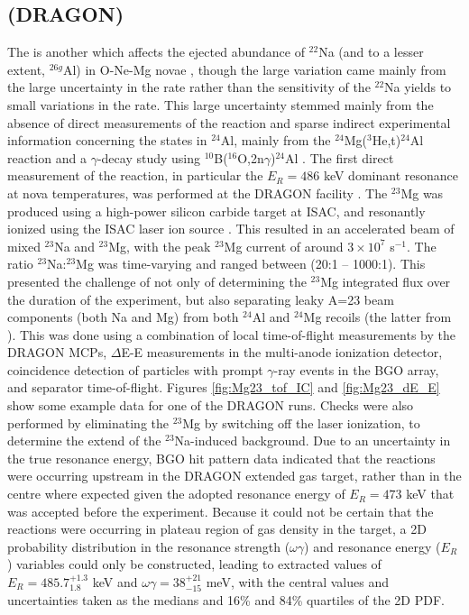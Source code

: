 \subsection{ (DRAGON)}
The  is another which affects the ejected abundance of $^{22}$Na (and to a lesser extent, $^{26g}$Al) in O-Ne-Mg novae \cite{ilia02}, though the large variation came mainly from the large uncertainty in the rate rather than the sensitivity of the $^{22}$Na yields to small variations in the rate. This large uncertainty stemmed mainly from the absence of direct measurements of the reaction and sparse indirect experimental information concerning the states in $^{24}$Al, mainly from the $^{24}$Mg($^{3}$He,t)$^{24}$Al reaction \cite{gre91,kub95,vis07,zeg08} and a $\gamma$-decay study using $^{10}$B($^{16}$O,2n$\gamma$)$^{24}$Al \cite{lot08}. 
The first direct measurement of the  reaction, in particular the $E_{R}=486$ keV dominant resonance at nova temperatures, was performed at the DRAGON facility \cite{eri10}. The $^{23}$Mg was produced using a high-power silicon carbide target at ISAC, and resonantly ionized using the ISAC laser ion source \cite{las09}. This resulted in an accelerated beam of mixed $^{23}$Na and $^{23}$Mg, with the peak $^{23}$Mg current of around $3\times10^{7}$ s$^{-1}$. The ratio $^{23}$Na:$^{23}$Mg was time-varying and ranged between (20:1 -- 1000:1). This presented the challenge of not only of determining the $^{23}$Mg integrated flux over the duration of the experiment, but also separating leaky A=23 beam components (both Na and Mg) from both $^{24}$Al and $^{24}$Mg recoils (the latter from ). This was done using a combination of local time-of-flight measurements by the DRAGON MCPs, $\Delta$E-E measurements in the multi-anode ionization detector, coincidence detection of particles with prompt $\gamma$-ray events in the BGO array, and separator time-of-flight. Figures \ref{fig:Mg23_tof_IC} and \ref{fig:Mg23_dE_E} show some example data for one of the DRAGON  runs. Checks were also performed by eliminating the $^{23}$Mg by switching off the laser ionization, to determine the extend of the $^{23}$Na-induced background.  
Due to an uncertainty in the true resonance energy, BGO hit pattern data indicated that the reactions were occurring upstream in the DRAGON extended gas target, rather than in the centre where expected given the adopted resonance energy of $E_{R}=473$ keV that was accepted before the experiment. Because it could not be certain that the reactions were occurring in plateau region of gas density in the target, a 2D probability distribution in the resonance strength ($\omega\gamma$) and resonance energy ($E_{R}$) variables could only be constructed, leading to extracted values of $E_{R}=485.7^{+1.3}_{1.8}$ keV and $\omega\gamma=38^{+21}_{-15}$ meV, with the central values and uncertainties taken as the medians and 16\% and 84\% quartiles of the 2D PDF. 
